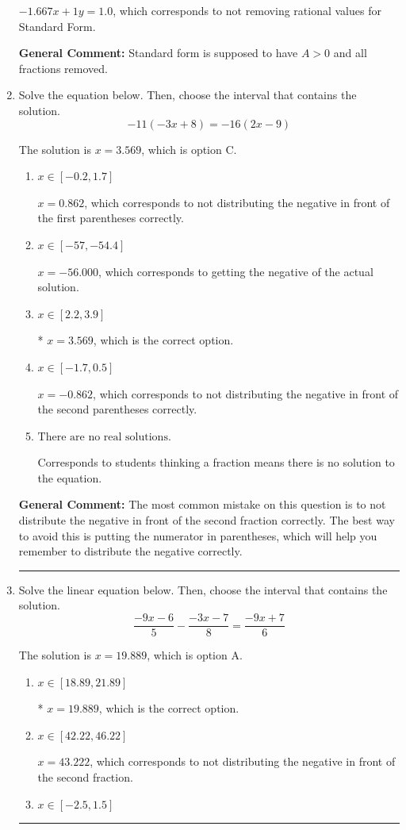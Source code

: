 \documentclass{extbook}[14pt]
\newcommand{\litem}[1]{\item #1

\rule{\textwidth}{0.4pt}}
\begin{document}
\begin{enumerate}
{\begin{enumerate}[label=\Alph*.]
 $-1.667x + 1y = 1.0$, which corresponds to not removing rational values for Standard Form.
\end{enumerate}

\textbf{General Comment:} Standard form is supposed to have $A > 0$ and all fractions removed.
}
\litem{
Solve the equation below. Then, choose the interval that contains the solution.
\[ -11(-3x + 8) = -16(2x -9) \]

The solution is \( x = 3.569 \), which is option C.\begin{enumerate}[label=\Alph*.]
\item \( x \in [-0.2, 1.7] \)

$x = 0.862$, which corresponds to not distributing the negative in front of the first parentheses correctly.
\item \( x \in [-57, -54.4] \)

$x = -56.000$, which corresponds to getting the negative of the actual solution.
\item \( x \in [2.2, 3.9] \)

* $x = 3.569$, which is the correct option.
\item \( x \in [-1.7, 0.5] \)

$x = -0.862$, which corresponds to not distributing the negative in front of the second parentheses correctly.
\item \( \text{There are no real solutions.} \)

Corresponds to students thinking a fraction means there is no solution to the equation.
\end{enumerate}

\textbf{General Comment:} The most common mistake on this question is to not distribute the negative in front of the second fraction correctly. The best way to avoid this is putting the numerator in parentheses, which will help you remember to distribute the negative correctly.
}
\litem{
Solve the linear equation below. Then, choose the interval that contains the solution.
\[ \frac{-9x -6}{5} - \frac{-3x -7}{8} = \frac{-9x + 7}{6} \]

The solution is \( x = 19.889 \), which is option A.\begin{enumerate}[label=\Alph*.]
\item \( x \in [18.89, 21.89] \)

* $x = 19.889$, which is the correct option.
\item \( x \in [42.22, 46.22] \)

 $x = 43.222$, which corresponds to not distributing the negative in front of the second fraction.
\item \( x \in [-2.5, 1.5] \)


\end{enumerate}}
\end{enumerate}
\end{document}
